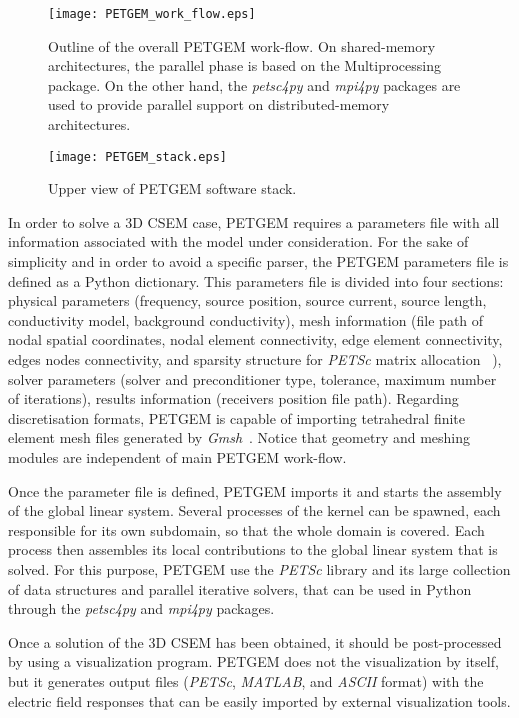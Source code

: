 \documentclass[review]{elsarticle}
\begin{document}
\begin{figure}[!htbp]
	\centering
	\texttt{[image: PETGEM\_work\_flow.eps]}
	\caption{Outline of the overall PETGEM work-flow. On shared-memory architectures, the parallel phase is based on the Multiprocessing package. On the other hand, the \textit{petsc4py} and \textit{mpi4py} packages are used to provide parallel support on distributed-memory architectures.}
	\label{fig:petgem_workflow}
\end{figure}
\begin{figure}[!htbp] 
	\centering    
	\texttt{[image: PETGEM\_stack.eps]}
	\caption{Upper view of PETGEM software stack.}
	\label{fig:petgem_sw_stack}
\end{figure}
In order to solve a 3D CSEM case, PETGEM requires a parameters file with all information associated with the model under consideration. For the sake of simplicity and in order to avoid a specific parser, the PETGEM parameters file is defined as a Python dictionary. This parameters file is divided into four sections: physical parameters (frequency, source position, source current, source length, conductivity model, background conductivity), mesh information (file path of nodal spatial coordinates, nodal element connectivity, edge element connectivity, edges nodes connectivity, and sparsity structure for \textit{PETSc} matrix allocation ~\citep{petsc2016}), solver parameters (solver and preconditioner type, tolerance, maximum number of iterations), results information (receivers position file path). Regarding discretisation formats, PETGEM is capable of importing tetrahedral finite element mesh files generated by \textit{Gmsh}~\citep{Geuzaine2008}. 
Notice that geometry and meshing modules are independent of main PETGEM work-flow.

Once the parameter file is defined, PETGEM imports it and starts the assembly of the global linear system. Several processes of the kernel can be spawned, each responsible for its own subdomain, so that the whole domain is covered. Each process then assembles its local contributions to the global linear system that is solved. For this purpose, PETGEM use the \textit{PETSc} library and its large collection of data structures and parallel iterative solvers, that can be used in Python through the \textit{petsc4py} and \textit{mpi4py} packages. 

Once a solution of the 3D CSEM has been obtained, it should be post-processed by using a visualization program. PETGEM does not the visualization by itself, but it generates output files (\textit{PETSc}, \textit{MATLAB}, and \textit{ASCII} format) with the electric field responses that can be easily imported by external visualization tools.
\end{document}
